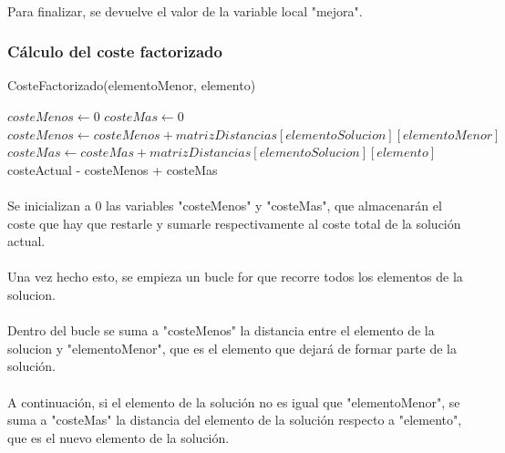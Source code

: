 \documentclass{article}
\begin{document}
	\paragraph{}Para finalizar, se devuelve el valor de la variable local "mejora".
	
	\paragraph{}
	
	\subsubsection{Cálculo del coste factorizado}
	\begin{algorithm}[H]
		\caption{CosteFactorizado(elementoMenor, elemento)}
		\begin{algorithmic}
			\STATE $costeMenos \leftarrow 0$
			\STATE $costeMas \leftarrow 0$
			\STATE $costeMenos \leftarrow costeMenos + matrizDistancias[elementoSolucion][elementoMenor]$
			\STATE $costeMas \leftarrow costeMas+matrizDistancias[elementoSolucion][elemento]$
			\ENDIF
			\ENDFOR
			\RETURN costeActual - costeMenos + costeMas	
		\end{algorithmic}
	\end{algorithm}
	
	\paragraph{}Se inicializan a 0 las variables "costeMenos" y "costeMas", que almacenarán el coste que hay que restarle y sumarle respectivamente al coste total de la solución actual.
	
	\paragraph{}Una vez hecho esto, se empieza un bucle for que recorre todos los elementos de la solucion.
	
	\paragraph{}Dentro del bucle se suma a "costeMenos" la distancia entre el elemento de la solucion y "elementoMenor", que es el elemento que dejará de formar parte de la solución.
	
	\paragraph{}A continuación, si el elemento de la solución no es igual que "elementoMenor", se suma a "costeMas" la distancia del elemento de la solución respecto a "elemento", que es el nuevo elemento de la solución. 
	
\end{document}

